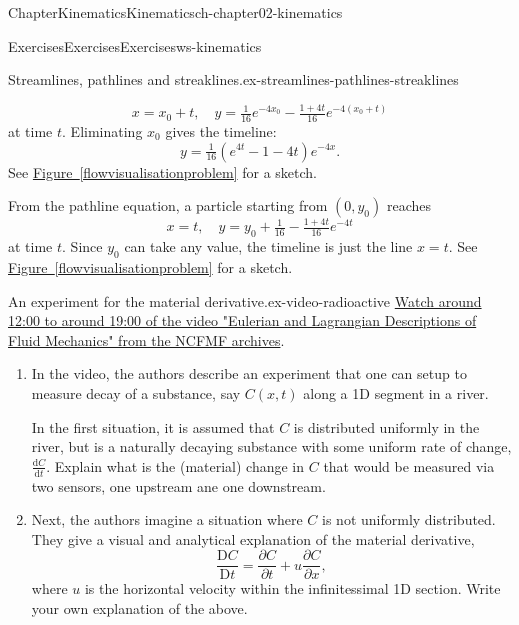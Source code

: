 \documentclass[oneside,10pt,]{book}
\newcommand{\xreffont}{\relax}
\numberwithin{equation}{section}
\newcommand{\de}{\mathrm{d}}
\newcommand{\dd}[2]{\frac{\de#1}{\de#2}}
\newcommand{\DD}[2]{\frac{\mathrm{D}#1}{\mathrm{D}#2}}
\newcommand{\pd}[2]{\frac{\partial#1}{\partial#2}}
\begin{document}
\begin{chapterptx}{Chapter}{Kinematics}{}{Kinematics}{}{}{ch-chapter02-kinematics}
\begin{exercises-section}{Exercises}{Exercises}{}{Exercises}{}{}{ws-kinematics}
\begin{divisionexercise}{6}{Streamlines, pathlines and streaklines.}{}{ex-streamlines-pathlines-streaklines}
\begin{enumerate}[font=\bfseries,label=(\alph*),ref=\alph*]
\begin{equation*}
x = x_0 + t,\quad
y = \tfrac{1}{16} e^{-4x_0}
- \tfrac{1+4t}{16} e^{-4(x_0+t)}
\end{equation*}
at time \(t\). Eliminating \(x_0\) gives the timeline:%
\begin{equation*}
y = \tfrac{1}{16}\left(e^{4t} - 1 - 4t\right)e^{-4x}.
\end{equation*}
See \hyperref[flowvisualisationproblem]{Figure~{\xreffont\ref{flowvisualisationproblem}}} for a sketch.%
\par
From the pathline equation, a particle starting from \((0,y_0)\) reaches%
\begin{equation*}
x = t,\quad
y = y_0 + \tfrac{1}{16}
- \tfrac{1+4t}{16} e^{-4t}
\end{equation*}
at time \(t\). Since \(y_0\) can take any value, the timeline is just the line \(x = t\). See \hyperref[flowvisualisationproblem]{Figure~{\xreffont\ref{flowvisualisationproblem}}} for a sketch.%
\end{enumerate}%
\end{divisionexercise}%
\begin{divisionexercise}{7}{An experiment for the material derivative.}{}{ex-video-radioactive}%
\href{https://techtv.mit.edu/collections/ifluids/videos/32597-eulerian-and-lagrangian-descriptions-in-fluid-mechanics}{Watch around 12:00 to around 19:00 of the video "Eulerian and Lagrangian Descriptions of Fluid Mechanics" from the NCFMF archives}.%
\begin{enumerate}[font=\bfseries,label=(\alph*),ref=\alph*]%
\item{}In the video, the authors describe an experiment that one can setup to measure decay of a substance, say \(C(x, t)\) along a 1D segment in a river.%
\par
In the first situation, it is assumed that \(C\) is distributed uniformly in the river, but is a naturally decaying substance with some uniform rate of change, \(\dd{C}{t}\). Explain what is the (material) change in \(C\) that would be measured via two sensors, one upstream ane one downstream.%
\item{}Next, the authors imagine a situation where \(C\) is not uniformly distributed. They give a visual and analytical explanation of the material derivative,%
\begin{equation*}
\DD{C}{t} = \pd{C}{t} + u \pd{C}{x},
\end{equation*}
where \(u\) is the horizontal velocity within the infinitessimal 1D section. Write your own explanation of the above.%
\end{enumerate}%
\end{divisionexercise}%
\end{exercises-section}
\end{chapterptx}
\end{document}
